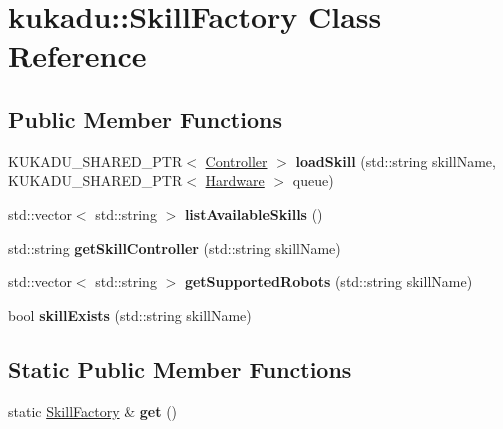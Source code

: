 \hypertarget{classkukadu_1_1SkillFactory}{}\section{kukadu\+:\+:Skill\+Factory Class Reference}
\label{classkukadu_1_1SkillFactory}
\subsection*{Public Member Functions}
\begin{DoxyCompactItemize}
\item 
K\+U\+K\+A\+D\+U\+\_\+\+S\+H\+A\+R\+E\+D\+\_\+\+P\+TR$<$ \hyperlink{classkukadu_1_1Controller}{Controller} $>$ {\bfseries load\+Skill} (std\+::string skill\+Name, K\+U\+K\+A\+D\+U\+\_\+\+S\+H\+A\+R\+E\+D\+\_\+\+P\+TR$<$ \hyperlink{classkukadu_1_1Hardware}{Hardware} $>$ queue)\hypertarget{classkukadu_1_1SkillFactory_a1075104387c04ff603a447a42059df89}{}\label{classkukadu_1_1SkillFactory_a1075104387c04ff603a447a42059df89}

\item 
std\+::vector$<$ std\+::string $>$ {\bfseries list\+Available\+Skills} ()\hypertarget{classkukadu_1_1SkillFactory_af4ba2108570b3fe21ae7d3b542bebcb9}{}\label{classkukadu_1_1SkillFactory_af4ba2108570b3fe21ae7d3b542bebcb9}

\item 
std\+::string {\bfseries get\+Skill\+Controller} (std\+::string skill\+Name)\hypertarget{classkukadu_1_1SkillFactory_a99bbad47f35201a082c85af15b054816}{}\label{classkukadu_1_1SkillFactory_a99bbad47f35201a082c85af15b054816}

\item 
std\+::vector$<$ std\+::string $>$ {\bfseries get\+Supported\+Robots} (std\+::string skill\+Name)\hypertarget{classkukadu_1_1SkillFactory_aa536c0de3dbeb048b57d92d1ea710587}{}\label{classkukadu_1_1SkillFactory_aa536c0de3dbeb048b57d92d1ea710587}

\item 
bool {\bfseries skill\+Exists} (std\+::string skill\+Name)\hypertarget{classkukadu_1_1SkillFactory_a589ccbf37993677058e4cb04caa443f1}{}\label{classkukadu_1_1SkillFactory_a589ccbf37993677058e4cb04caa443f1}

\end{DoxyCompactItemize}
\subsection*{Static Public Member Functions}
\begin{DoxyCompactItemize}
\item 
static \hyperlink{classkukadu_1_1SkillFactory}{Skill\+Factory} \& {\bfseries get} ()\hypertarget{classkukadu_1_1SkillFactory_ae1777d7a32f4d032ff1f30c45c9bfde2}{}\label{classkukadu_1_1SkillFactory_ae1777d7a32f4d032ff1f30c45c9bfde2}

\end{DoxyCompactItemize}


